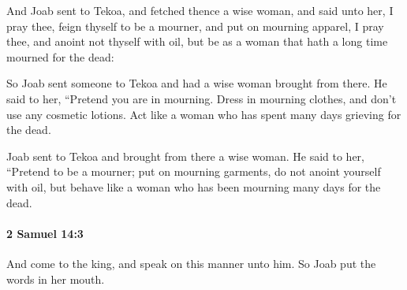 			\begin{versebox}
					\item[BHS] 
					\item[ASV] And Joab sent to Tekoa, and fetched thence a wise woman, and said unto her, I pray thee, feign thyself to be a mourner, and put on mourning apparel, I pray thee, and anoint not thyself with oil, but be as a woman that hath a long time mourned for the dead:
					\item[NIV] So Joab sent someone to Tekoa and had a wise woman brought from there. He said to her, “Pretend you are in mourning. Dress in mourning clothes, and don’t use any cosmetic lotions. Act like a woman who has spent many days grieving for the dead.
					\item[NRSV] Joab sent to Tekoa and brought from there a wise woman. He said to her, “Pretend to be a mourner; put on mourning garments, do not anoint yourself with oil, but behave like a woman who has been mourning many days for the dead.
			\end{versebox}

		\paragraph{2 Samuel 14:3} %
			\label{2SAMUEL-14-3}

			And come to the king, and speak on this manner unto him. So Joab put the words in her mouth.

